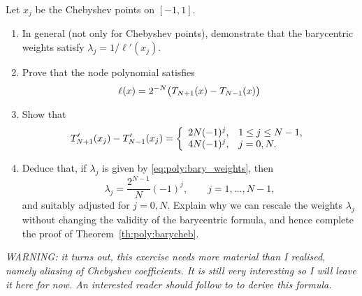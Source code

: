 \begin{exercise}
   \label{exr:poly:bary}
   Let $x_j$ be the Chebyshev points on $[-1,1]$.
   \begin{enumerate} \ilist
   \item In general (not only for Chebyshev points), demonstrate that the
   barycentric weights satisfy $\lambda_j = 1 / \ell'(x_j)$.
   \item Prove that the node polynomial satisfies 
   \[
      \ell(x) = 2^{-N} \big(T_{N+1}(x) - T_{N-1}(x)\big)
   \]
   \item Show that 
   \[
      T_{N+1}'(x_j) - T_{N-1}'(x_j) = 
      \left\{ \begin{array}{ll}  
         2N(-1)^j, & 1 \leq j \leq N-1, \\
         4N(-1)^j, & j = 0, N.
       \end{array} \right.
   \]
   \item Deduce that, if $\lambda_j$ is given by \eqref{eq:poly:bary_weights}, then 
   \[
      \lambda_j = \frac{2^{N-1}}{N} (-1)^j, \qquad j = 1, \dots, N-1,
   \]
   and suitably adjusted for $j = 0, N$. Explain why we can rescale the weights
   $\lambda_j$ without changing the validity of the barycentric formula, and
   hence complete the proof of Theorem~\ref{th:poly:barycheb}.
   \end{enumerate}

   {\it WARNING: it turns out, this exercise needs more material than I
   realised, namely aliasing of Chebyshev coefficients. It is still very
   interesting so I will leave it here for now. An interested reader should
   follow to \cite[Sec. 5]{Trefethen2013-rg} to derive this formula.}
\end{exercise}


